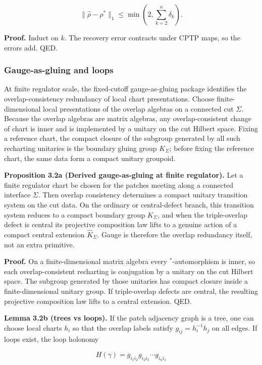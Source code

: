 \[
\| \hat{\rho} - \rho^{\ast} \|_1 \le \min\left(2, \sum_{k=2}^n \delta_k\right).
\]

\textbf{Proof.} Induct on \(k\). The recovery error contracts under CPTP maps, so the errors add. QED.

\subsubsection{Gauge-as-gluing and loops}\label{32-gauge-as-gluing-and-loops}

At finite regulator scale, the fixed-cutoff gauge-as-gluing package identifies the overlap-consistency redundancy of local chart presentations. Choose finite-dimensional local presentations of the overlap algebras on a connected cut \(\Sigma\). Because the overlap algebras are matrix algebras, any overlap-consistent change of chart is inner and is implemented by a unitary on the cut Hilbert space. Fixing a reference chart, the compact closure of the subgroup generated by all such recharting unitaries is the boundary gluing group \(K_\Sigma\); before fixing the reference chart, the same data form a compact unitary groupoid.

\textbf{Proposition 3.2a (Derived gauge-as-gluing at finite regulator).} Let a finite regulator chart be chosen for the patches meeting along a connected interface \(\Sigma\). Then overlap consistency determines a compact unitary transition system on the cut data. On the ordinary or central-defect branch, this transition system reduces to a compact boundary group \(K_\Sigma\), and when the triple-overlap defect is central its projective composition law lifts to a genuine action of a compact central extension \(\widehat K_\Sigma\). Gauge is therefore the overlap redundancy itself, not an extra primitive.

\textbf{Proof.} On a finite-dimensional matrix algebra every \(^*\)-automorphism is inner, so each overlap-consistent recharting is conjugation by a unitary on the cut Hilbert space. The subgroup generated by those unitaries has compact closure inside a finite-dimensional unitary group. If triple-overlap defects are central, the resulting projective composition law lifts to a central extension. QED.

\textbf{Lemma 3.2b (trees vs loops).} If the patch adjacency graph is a tree, one can choose local charts \(h_i\) so that the overlap labels satisfy \(g_{ij} = h_i^{-1} h_j\) on all edges. If loops exist, the loop holonomy

\[
H(\gamma) = g_{i_1 i_2} g_{i_2 i_3} \cdots g_{i_n i_1}
\]

